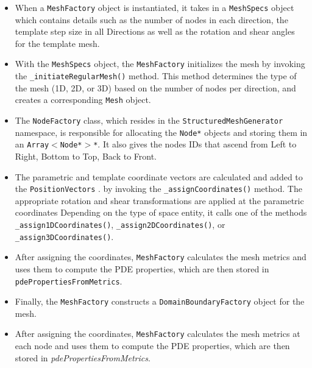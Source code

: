 \documentclass{article}
\begin{document}
\begin{itemize}

	\item When a \texttt{MeshFactory} object is instantiated, it takes in a \texttt{MeshSpecs} object which contains details such as the number of nodes in each direction, the template step size in all Directions as well as the rotation and shear angles for the template mesh.
	
	\item With the \texttt{MeshSpecs} object, the \texttt{MeshFactory} initializes the mesh by invoking the \newline \texttt{\_initiateRegularMesh()} method. This method determines the type of the mesh (1D, 2D, or 3D) based on the number of nodes per direction, and creates a corresponding \texttt{Mesh} object.
	
	
	
	\item The \texttt{NodeFactory} class, which resides in the \texttt{StructuredMeshGenerator} namespace, is responsible for allocating the \texttt{Node*} objects and storing them in an \texttt{Array$<$\texttt{Node}*$>$*}. It also gives the nodes IDs that ascend from Left to Right, Bottom to Top, Back to Front.
	
	\item The parametric and template coordinate vectors are calculated and added to the \texttt{PositionVectors} . by invoking the \texttt{\_assignCoordinates()} method. The appropriate rotation and shear transformations are applied at the parametric coordinates Depending on the type of space entity, it calls one of the methods \texttt{\_assign1DCoordinates()}, \texttt{\_assign2DCoordinates()}, or \texttt{\_assign3DCoordinates()}.
	
	
	\item After assigning the coordinates, \texttt{MeshFactory} calculates the mesh metrics and uses them to compute the PDE properties, which are then stored in \texttt{pdePropertiesFromMetrics}.
	\item Finally, the \texttt{MeshFactory} constructs a \texttt{DomainBoundaryFactory} object for the mesh.
	
	\item After assigning the coordinates, \texttt{MeshFactory} calculates the mesh metrics at each node and uses them to compute the PDE properties, which are then stored in \textit{pdePropertiesFromMetrics}.

\end{itemize}
\end{document}
